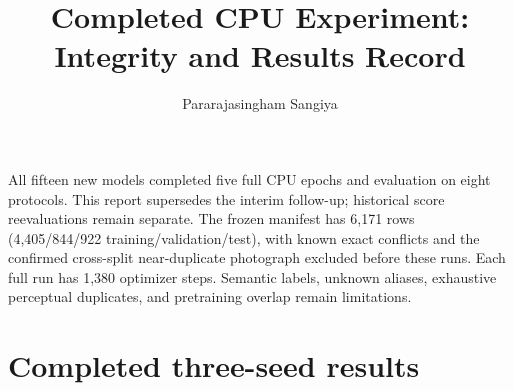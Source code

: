 \documentclass[10pt,journal,onecolumn,compsoc]{IEEEtran}
\begin{document}
\title{Completed CPU Experiment: Integrity and Results Record}
\author{Pararajasingham Sangiya}
\maketitle
All fifteen new models completed five full CPU epochs and evaluation on eight protocols. This report supersedes the interim follow-up; historical score reevaluations remain separate. The frozen manifest has 6,171 rows (4,405/844/922 training/validation/test), with known exact conflicts and the confirmed cross-split near-duplicate photograph excluded before these runs. Each full run has 1,380 optimizer steps. Semantic labels, unknown aliases, exhaustive perceptual duplicates, and pretraining overlap remain limitations.

\section{Completed three-seed results}
\end{document}
